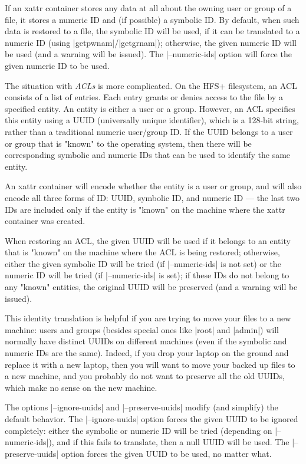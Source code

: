 \documentclass[11pt]{article}
\begin{document}
\begin{description}
If an xattr container stores any data at all about
the owning user or group of a file, 
it stores a numeric ID and (if possible)
a symbolic ID.
By default, when such data is restored to a file,
the symbolic ID will be used, if it can be translated
to a numeric ID (using |getpwnam|/|getgrnam|);
otherwise, the given numeric ID will be used (and a warning will be issued).
The |--numeric-ids| option will force the given numeric ID
to be used.

The situation with \emph{ACLs} is more complicated.
On the HFS+ filesystem, an ACL consists of a list of entries.
Each entry grants or denies access to the file by a specified
entity.
An entity is either a user or a group.
However, an ACL specifies this entity using a UUID (universally unique
identifier), which is a 128-bit string,
rather than a traditional numeric user/group ID.
If the UUID belongs to a user or group that is "known" 
to the operating system,
then there will be corresponding 
symbolic and numeric IDs that can be used to identify the same entity.

An xattr container will encode whether the entity is a user
or group, and will also encode all three forms of ID:
UUID, symbolic ID, and numeric ID --- the last two IDs are included
only if the entity is "known" on the machine where the xattr container 
was created.

When restoring an ACL, the given UUID will be used if it belongs
to an entity that is "known" on the machine where the ACL is
being restored;
otherwise, either the given symbolic ID will be tried (if |--numeric-ids|
is not set) or the numeric ID will be tried (if |--numeric-ids| is set);
if these IDs do not belong to any "known" entities, the 
original UUID will be preserved (and a warning will be issued).

This identity translation is helpful if you are trying to move your
files to a new machine: users and groups (besides special
ones like |root| and |admin|) will normally have
distinct UUIDs on different machines (even if the symbolic and numeric
IDs are the same).
Indeed, if you drop your laptop on the ground and replace
it with a new laptop, then you will want to move your backed up
files to a new machine, and you probably do not want to
preserve all the old UUIDs, which make no sense on the new machine.

The options |--ignore-uuids| and |--preserve-uuids| modify (and simplify) the
default behavior.
The |--ignore-uuids| option forces the given UUID to be ignored
completely: either the symbolic or numeric ID will be tried
(depending on |--numeric-ids|), and if this fails to translate,
then a null UUID will be used.
The |--preserve-uuids| option forces the given UUID to be
used, no matter what.


\end{description}
\end{document}
